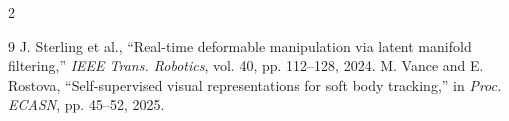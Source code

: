 \documentclass[10pt, a4paper]{scrartcl}
\begin{document}
\begin{multicols}{2}
\begin{thebibliography}{9}
 J. Sterling et al., ``Real-time deformable manipulation via latent manifold filtering,'' \emph{IEEE Trans. Robotics}, vol. 40, pp. 112--128, 2024.
 M. Vance and E. Rostova, ``Self-supervised visual representations for soft body tracking,'' in \emph{Proc. ECASN}, pp. 45--52, 2025.
\end{thebibliography}

\end{multicols}
\end{document}
